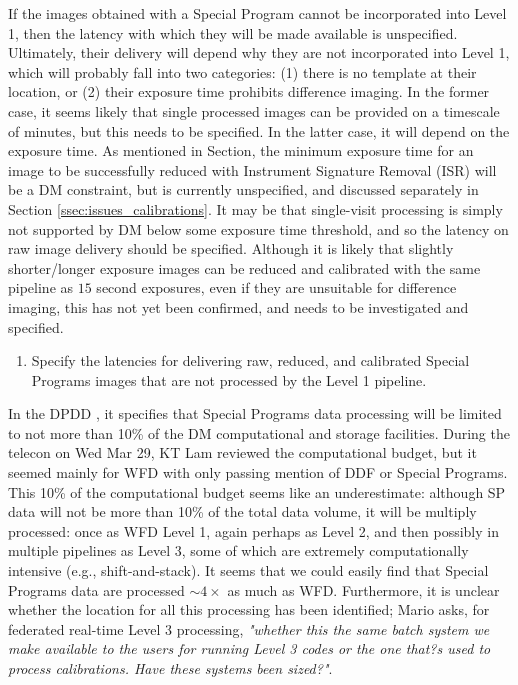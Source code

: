 \documentclass[DM,lsstdraft,toc]{lsstdoc}
\begin{document}
If the images obtained with a Special Program cannot be incorporated into Level 1, then the latency with which they will be made available is unspecified. Ultimately, their delivery will depend why they are not incorporated into Level 1, which will probably fall into two categories: (1) there is no template at their location, or (2) their exposure time prohibits difference imaging. In the former case, it seems likely that single processed images can be provided on a timescale of minutes, but this needs to be specified. In the latter case, it will depend on the exposure time. As mentioned in Section\label{ssec:dmdocs_SPinWFD_L1}, the minimum exposure time for an image to be successfully reduced with Instrument Signature Removal (ISR) will be a DM constraint, but is currently unspecified, and discussed separately in Section \ref{ssec:issues_calibrations}. It may be that single-visit processing is simply not supported by DM below some exposure time threshold, and so the latency on raw image delivery should be specified. Although it is likely that slightly shorter/longer exposure images can be reduced and calibrated with the same pipeline as $15$ second exposures, even if they are unsuitable for difference imaging, this has not yet been confirmed, and needs to be investigated and specified.

\begin{enumerate}[resume,topsep=-10pt,label= \textbf{Concern \Roman*.}] \item \label{C3} Specify the latencies for delivering raw, reduced, and calibrated Special Programs images that are not processed by the Level 1 pipeline. \end{enumerate}

In the DPDD \citep{LSE-163}, it specifies that Special Programs data processing will be limited to not more than 10\% of the DM computational and storage facilities. During the telecon on Wed Mar 29, KT Lam reviewed the computational budget, but it seemed mainly for WFD with only passing mention of DDF or Special Programs. This 10\% of the computational budget seems like an underestimate: although SP data will not be more than 10\% of the total data volume, it will be multiply processed: once as WFD Level 1, again perhaps as Level 2, and then possibly in multiple pipelines as Level 3, some of which are extremely computationally intensive (e.g., shift-and-stack). It seems that we could easily find that Special Programs data are processed $\sim4\times$ as much as WFD. Furthermore, it is unclear whether the location for all this processing has been identified; Mario asks, for federated real-time Level 3 processing, {\it "whether this the same batch system we make available to the users for running Level 3 codes or the one that?s used to process calibrations. Have these systems been sized?"}.
\end{document}
